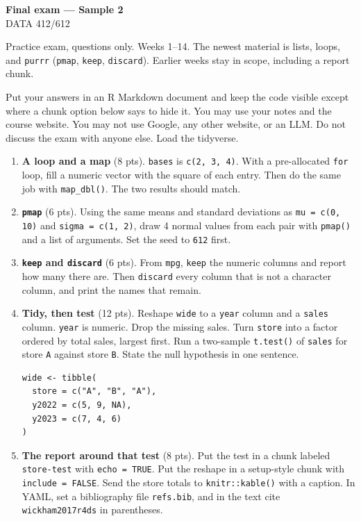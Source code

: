 \documentclass[11pt]{article}
\begin{document}
\begin{center}
{\LARGE\bfseries Final exam --- Sample 2}\\[0.35em]
DATA 412/612
\end{center}

\vspace{0.2em}

Practice exam, questions only. Weeks 1--14. The newest material
is lists, loops, and \texttt{purrr} (\texttt{pmap}, \texttt{keep},
\texttt{discard}). Earlier weeks stay in scope, including a report chunk.

Put your answers in an R Markdown document and keep the code visible
except where a chunk option below says to hide it.
You may use your notes and the course website.
You may not use Google, any other website, or an LLM.
Do not discuss the exam with anyone else.
Load the tidyverse.

\begin{enumerate}
\item \textbf{A loop and a map} (8 pts).
\texttt{bases} is \texttt{c(2, 3, 4)}.
With a pre-allocated \texttt{for} loop, fill a numeric vector with
the square of each entry.
Then do the same job with \texttt{map\_dbl()}.
The two results should match.

\item \textbf{\texttt{pmap}} (6 pts).
Using the same means and standard deviations as
\texttt{mu = c(0, 10)} and \texttt{sigma = c(1, 2)}, draw 4 normal
values from each pair with \texttt{pmap()} and a list of arguments.
Set the seed to \texttt{612} first.

\item \textbf{\texttt{keep} and \texttt{discard}} (6 pts).
From \texttt{mpg}, \texttt{keep} the numeric columns and report how
many there are.
Then \texttt{discard} every column that is not a character column,
and print the names that remain.

\item \textbf{Tidy, then test} (12 pts).
Reshape \texttt{wide} to a \texttt{year} column and a \texttt{sales}
column. \texttt{year} is numeric. Drop the missing sales.
Turn \texttt{store} into a factor ordered by total sales, largest
first.
Run a two-sample \texttt{t.test()} of \texttt{sales} for store
\texttt{A} against store \texttt{B}. State the null hypothesis in
one sentence.

\begin{lstlisting}
wide <- tibble(
  store = c("A", "B", "A"),
  y2022 = c(5, 9, NA),
  y2023 = c(7, 4, 6)
)
\end{lstlisting}

\item \textbf{The report around that test} (8 pts).
Put the test in a chunk labeled \texttt{store-test} with
\texttt{echo = TRUE}.
Put the reshape in a setup-style chunk with \texttt{include = FALSE}.
Send the store totals to \texttt{knitr::kable()} with a caption.
In YAML, set a bibliography file \texttt{refs.bib}, and in the text
cite \texttt{wickham2017r4ds} in parentheses.
\end{enumerate}
\end{document}
